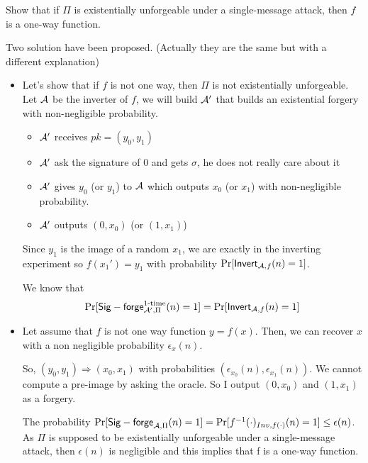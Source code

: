 Show that if $\Pi$ is existentially unforgeable under a single-message
attack, then $f$ is a one-way function.


\begin{solution}
	Two solution have been proposed. (Actually they are the same but with a different explanation)
	\begin{itemize}
		\item
		Let's show that if $f$ is not one way, then $\Pi$ is not existentially unforgeable.
		Let $\mathcal{A}$ be the inverter of $f$, we will build $\mathcal{A}'$ that builds an existential forgery with non-negligible probability.

		\begin{itemize}
			\item $\mathcal{A}'$ receives $pk = (y_0, y_1)$
			\item $\mathcal{A}'$ ask the signature of 0 and gets $\sigma$, he does not really care about it
			\item $\mathcal{A}'$ gives $y_0$ (or $y_1$) to $\mathcal{A}$ which outputs $x_0$ (or $x_1$) with non-negligible probability.
			\item $\mathcal{A}'$ outputs $(0,x_0)$ (or $(1, x_1)$)
		\end{itemize}
		Since $y_1$ is the image of a random $x_1$, we are exactly in the inverting experiment so $f(x_1') = y_1$
		with probability $\Pr[\mathsf{Invert}_{\mathcal{A},f}(n) = 1]$.

		We know that
		\[
		\Pr[\mathsf{Sig-forge}^{\text{1-time}}_{\mathcal{A}',\Pi}(n) = 1] = \Pr[\mathsf{Invert}_{\mathcal{A},f}(n) = 1]
		\]
		\item
		Let assume that $f$ is not one way function $y = f(x)$.
		Then, we can recover $x$ with a non negligible probability $\epsilon_x (n)$.

		So, $(y_0, y_1) \Rightarrow (x_0, x_1)$ with probabilities $(\epsilon_{x_0} (n), \epsilon_{x_1} (n))$.
		We cannot compute a pre-image by asking the oracle. So I output $(0, x_0)$ and $(1, x_1)$ as a forgery.

		The probability $\Pr[\mathsf{Sig-forge}_{\mathcal{A},\Pi}(n)=1]= \Pr[f^{-1}(\cdot)_{Inv,f(\cdot)}(n)=1] \leq \epsilon(n)$. As $\Pi$ is supposed to be existentially unforgeable under a single-message attack, then $\epsilon(n)$ is negligible and this implies that f is a one-way function.
	\end{itemize}
\end{solution}


